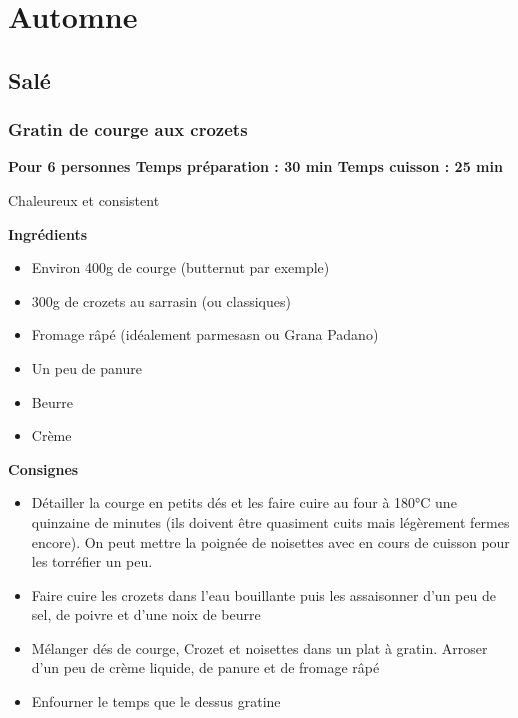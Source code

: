 \documentclass[]{book}
\providecommand{\tightlist}{%
  \setlength{\itemsep}{0pt}\setlength{\parskip}{0pt}}
\begin{document}
\hypertarget{automne}{%
\chapter*{Automne}\label{automne}}

\hypertarget{saluxe9-3}{%
\section*{Salé}\label{saluxe9-3}}

\hypertarget{gratin-de-courge-aux-crozets}{%
\subsection*{\texorpdfstring{{Gratin de courge aux crozets}}{Gratin de courge aux crozets}}\label{gratin-de-courge-aux-crozets}}

\begin{salebox}
\textbf{Pour 6 personnes \textbar{} Temps préparation : 30 min
\textbar{} Temps cuisson : 25 min}

Chaleureux et consistent
\end{salebox}

\textbf{Ingrédients}

\begin{itemize}
\tightlist
\item
  Environ 400g de courge (butternut par exemple)
\item
  300g de crozets au sarrasin (ou classiques)
\item
  Fromage râpé (idéalement parmesasn ou Grana Padano)
\item
  Un peu de panure
\item
  Beurre
\item
  Crème
\end{itemize}

\textbf{Consignes}

\begin{itemize}
\tightlist
\item
  Détailler la courge en petits dés et les faire cuire au four à 180°C une quinzaine de minutes (ils doivent être quasiment cuits mais légèrement fermes encore). On peut mettre la poignée de noisettes avec en cours de cuisson pour les torréfier un peu.
\item
  Faire cuire les crozets dans l'eau bouillante puis les assaisonner d'un peu de sel, de poivre et d'une noix de beurre
\item
  Mélanger dés de courge, Crozet et noisettes dans un plat à gratin. Arroser d'un peu de crème liquide, de panure et de fromage râpé
\item
  Enfourner le temps que le dessus gratine
\end{itemize}
\end{document}
